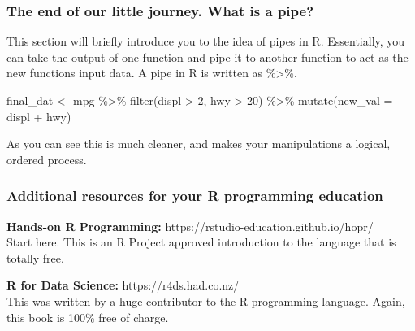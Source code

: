\documentclass[aspectratio=169]{beamer}
\begin{document}
	\begin{frame}[fragile]
		\frametitle{The end of our little journey. What is a pipe?}
		
		This section will briefly introduce you to the idea of pipes in R. Essentially, you can take the output of one function and pipe it to another function to act as the new functions input data.	A pipe in R is written as \%>\%.
		
		\begin{semiverbatim}
         final_dat <- mpg \%>\% filter(displ > 2, hwy > 20) \%>\%
         mutate(new_val = displ + hwy) 
		\end{semiverbatim}
		
		As you can see this is much cleaner, and makes your manipulations a logical, ordered process.
		
	\end{frame}

	\begin{frame}
		\frametitle{Additional resources for your R programming education}
		
		\textbf{Hands-on R Programming:} https://rstudio-education.github.io/hopr/ \\
		Start here. This is an R Project approved introduction to the language that is totally free.
		
		\textbf{R for Data Science:} https://r4ds.had.co.nz/ \\
		This was written by a huge contributor to the R programming language. Again, this book is 100\% free of charge.
		
		
	\end{frame}
	
\end{document}

